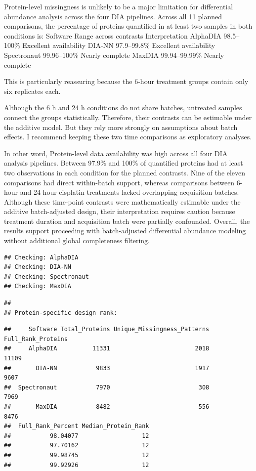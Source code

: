 \documentclass[
  10pt,
]{article}
\begin{document}
Protein-level missingness is unlikely to be a major limitation for
differential abundance analysis across the four DIA pipelines. Across
all 11 planned comparisons, the percentage of proteins quantified in at
least two samples in both conditions is: Software Range across contrasts
Interpretation AlphaDIA 98.5--100\% Excellent availability DIA-NN
97.9--99.8\% Excellent availability Spectronaut 99.96--100\% Nearly
complete MaxDIA 99.94--99.99\% Nearly complete

This is particularly reassuring because the 6-hour treatment groups
contain only six replicates each.

Although the 6 h and 24 h conditions do not share batches, untreated
samples connect the groups statistically. Therefore, their contrasts can
be estimable under the additive model. But they rely more strongly on
assumptions about batch effects. I recommend keeping these two time
comparisons as exploratory analyses.

In other word, Protein-level data availability was high across all four
DIA analysis pipelines. Between 97.9\% and 100\% of quantified proteins
had at least two observations in each condition for the planned
contrasts. Nine of the eleven comparisons had direct within-batch
support, whereas comparisons between 6-hour and 24-hour cisplatin
treatments lacked overlapping acquisition batches. Although these
time-point contrasts were mathematically estimable under the additive
batch-adjusted design, their interpretation requires caution because
treatment duration and acquisition batch were partially confounded.
Overall, the results support proceeding with batch-adjusted differential
abundance modeling without additional global completeness filtering.

\begin{verbatim}
## Checking: AlphaDIA 
## Checking: DIA-NN 
## Checking: Spectronaut 
## Checking: MaxDIA
\end{verbatim}

\begin{verbatim}
## 
## Protein-specific design rank:
\end{verbatim}

\begin{verbatim}
##     Software Total_Proteins Unique_Missingness_Patterns Full_Rank_Proteins
##     AlphaDIA          11331                        2018              11109
##       DIA-NN           9833                        1917               9607
##  Spectronaut           7970                         308               7969
##       MaxDIA           8482                         556               8476
##  Full_Rank_Percent Median_Protein_Rank
##           98.04077                  12
##           97.70162                  12
##           99.98745                  12
##           99.92926                  12
\end{verbatim}
\end{document}
